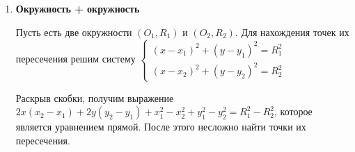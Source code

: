 \begin{enumerate}
    \item \textbf{Окружность + окружность}

    Пусть есть две окружности $(O_1, R_1)$ и $(O_2, R_2)$. Для нахождения точек их пересечения решим систему $\begin{cases}
        (x - x_1)^2 + (y - y_1)^2 = R_1^2 \\
        (x - x_2)^2 + (y - y_2)^2 = R_2^2
    \end{cases}$

    Раскрыв скобки, получим выражение $2x(x_2-x_1) + 2y(y_2-y_1) + x_1^2 - x_2^2 + y_1^2 - y_2^2 = R_1^2 - R_2^2$, которое является уравнением прямой. После этого несложно найти точки их пересечения.
\end{enumerate}
\pagebreak